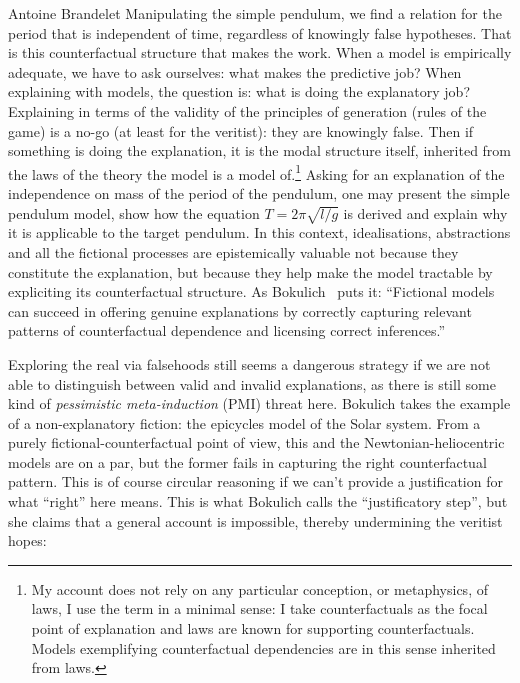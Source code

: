 \begin{artengenv}{Antoine Brandelet}
Manipulating the simple pendulum, we find a relation for the period that is independent of time, regardless of knowingly false hypotheses. That is this counterfactual structure that makes the work. When a model is empirically adequate, we have to ask ourselves: what makes the predictive job? When explaining with models, the question is: what is doing the explanatory job? Explaining in terms of the validity of the principles of generation (rules of the game) is a no-go (at least for the veritist): they are knowingly false. Then if something is doing the explanation, it is the modal structure itself, inherited from the laws of the theory the model is a model of.\footnote{My account does not rely on any particular conception, or metaphysics, of laws, I use the term in a minimal sense: I take counterfactuals as the focal point of explanation and laws are known for supporting counterfactuals. Models exemplifying counterfactual dependencies are in this sense inherited from laws.} Asking for an explanation of the independence on mass of the period of the pendulum, one may present the simple pendulum model, show how the equation $T = 2\pi \sqrt{l/g}$ is derived and explain why it is applicable to the target pendulum. In this context, idealisations, abstractions and all the fictional processes are epistemically valuable not because they constitute the explanation, but because they help make the model tractable by expliciting its counterfactual structure. As Bokulich~\parencite*[p.1]{Bokulich2016} puts it: ``Fictional models can succeed in offering genuine explanations by correctly capturing relevant patterns of counterfactual dependence and licensing correct inferences.''

Exploring the real via falsehoods still seems a dangerous strategy if we are not able to distinguish between valid and invalid explanations, as there is still some kind of \textit{pessimistic meta-induction} (PMI) threat here. Bokulich takes the example of a non-explanatory fiction: the epicycles model of the Solar system. From a purely fictional-counterfactual point of view, this and the Newtonian-heliocentric models are on a par, but the former fails in capturing the right counterfactual pattern. This is of course circular reasoning if we can't provide a justification for what ``right'' here means. This is what Bokulich calls the ``justificatory step'', but she claims that a general account is impossible, thereby undermining the veritist hopes: 



\end{artengenv}
